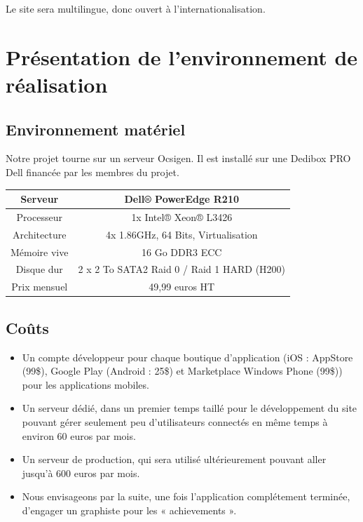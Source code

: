\documentclass{life-fr}
\begin{document}
Le site sera multilingue, donc ouvert à l'internationalisation.

\chapter{Présentation de l’environnement de réalisation}

\section{Environnement matériel}

Notre projet tourne sur un serveur Ocsigen. Il est installé sur une Dedibox PRO Dell financée par les membres du projet.

\vspace{20pt}

\begin{tabular}{|c|c|}
  \hline
   Serveur & Dell® PowerEdge R210\\
  \hline
  Processeur & 1x Intel® Xeon® L3426\\
  \hline
  Architecture & 4x 1.86GHz, 64 Bits, Virtualisation\\
  \hline
  Mémoire vive & 16 Go DDR3 ECC\\
  \hline
  Disque dur & 2 x 2 To SATA2 Raid 0 / Raid 1 HARD (H200)\\
  \hline
  Prix mensuel & 49,99 euros HT\\
  \hline
\end{tabular}

\vspace{20pt}

\section{Coûts}

\begin{itemize}
  \item Un compte développeur pour chaque boutique d'application (iOS : AppStore (99\$), Google Play (Android : 25\$) et Marketplace Windows Phone (99\$)) pour les applications mobiles.
  \item Un serveur dédié, dans un premier temps taillé pour le développement du site pouvant gérer seulement peu d'utilisateurs connectés en même temps à environ 60 euros par mois.
  \item Un serveur de production, qui sera utilisé ultérieurement pouvant aller jusqu'à 600 euros par mois.
  \item Nous envisageons par la suite, une fois l'application complétement terminée, d'engager un graphiste pour les « achievements ».
\end{itemize}
\end{document}
